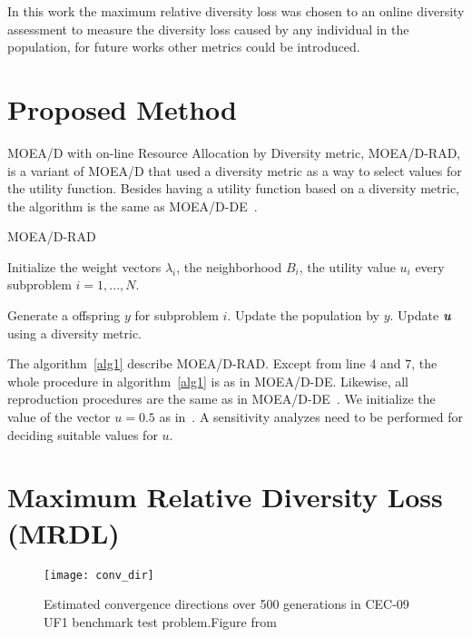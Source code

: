 \documentclass{IEEEtran}
\begin{document}
In this work the maximum relative diversity loss was chosen to an online diversity assessment to measure the diversity loss caused by any individual in the population, for future works other metrics could be introduced.



\section{Proposed Method}

MOEA/D with on-line Resource Allocation by Diversity metric, MOEA/D-RAD, is a variant of MOEA/D that used a diversity metric as a way to select values for the utility function. Besides having a utility function based on a diversity metric, the algorithm is the same as MOEA/D-DE~\cite{li2009multiobjective}.

\begin{algorithm}[h]
	\caption{MOEA/D-RAD}\label{alg1}
	\begin{algorithmic}[1]

	\State Initialize the weight vectors $\lambda_i$, the neighborhood $B_i$, the utility value $u_i$ every subproblem $i=1,...,N$.
		
				\State Generate a offspring $y$ for subproblem $i$.
				\State Update the population by $y$.
			\EndIf
	\EndFor
	\State Update \textit{\textbf{u}} using a diversity metric.
		\EndWhile
	\end{algorithmic}
\end{algorithm}


The algorithm~\ref{alg1} describe MOEA/D-RAD. Except from line 4 and 7, the whole procedure in algorithm~\ref{alg1} is as in MOEA/D-DE. Likewise, all reproduction procedures are the same as in MOEA/D-DE~\cite{li2009multiobjective}. We initialize the value of the vector $u=0.5$ as in~\cite{zhou2016all}. A sensitivity analyzes need to be performed for deciding suitable values for $u$.

\section{Maximum Relative Diversity Loss (MRDL)} 

\begin{figure}[!t]
	\centering
	\texttt{[image: conv\_dir]}
	\caption{Estimated convergence directions over 500 generations in CEC-09 UF1 benchmark test problem.Figure from~\cite{gee2015online}}
	\label{fig4}
\end{figure}
\end{document}
